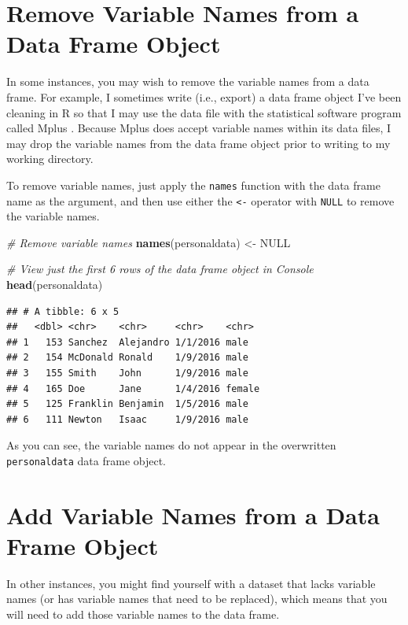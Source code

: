 \documentclass[]{book}
\newenvironment{Shaded}{\begin{snugshade}}{\end{snugshade}}
\newcommand{\KeywordTok}[1]{\textcolor[rgb]{0.13,0.29,0.53}{\textbf{#1}}}
\newcommand{\StringTok}[1]{\textcolor[rgb]{0.31,0.60,0.02}{#1}}
\newcommand{\CommentTok}[1]{\textcolor[rgb]{0.56,0.35,0.01}{\textit{#1}}}
\newcommand{\OtherTok}[1]{\textcolor[rgb]{0.56,0.35,0.01}{#1}}
\newcommand{\NormalTok}[1]{#1}
\begin{document}
\section{Remove Variable Names from a Data Frame
Object}\label{remove-variable-names-from-a-data-frame-object}

In some instances, you may wish to remove the variable names from a data
frame. For example, I sometimes write (i.e., export) a data frame object
I've been cleaning in R so that I may use the data file with the
statistical software program called Mplus \citep{mplus}. Because Mplus
does accept variable names within its data files, I may drop the
variable names from the data frame object prior to writing to my working
directory.

To remove variable names, just apply the \texttt{names} function with
the data frame name as the argument, and then use either the
\texttt{\textless{}-} operator with \texttt{NULL} to remove the variable
names.

\begin{Shaded}
\begin{Highlighting}[]
\CommentTok{# Remove variable names}
\KeywordTok{names}\NormalTok{(personaldata) <-}\StringTok{ }\OtherTok{NULL}

\CommentTok{# View just the first 6 rows of the data frame object in Console}
\KeywordTok{head}\NormalTok{(personaldata)}
\end{Highlighting}
\end{Shaded}

\begin{verbatim}
## # A tibble: 6 x 5
##   <dbl> <chr>    <chr>     <chr>    <chr> 
## 1   153 Sanchez  Alejandro 1/1/2016 male  
## 2   154 McDonald Ronald    1/9/2016 male  
## 3   155 Smith    John      1/9/2016 male  
## 4   165 Doe      Jane      1/4/2016 female
## 5   125 Franklin Benjamin  1/5/2016 male  
## 6   111 Newton   Isaac     1/9/2016 male
\end{verbatim}

As you can see, the variable names do not appear in the overwritten
\texttt{personaldata} data frame object.

\section{Add Variable Names from a Data Frame
Object}\label{add-variable-names-from-a-data-frame-object}

In other instances, you might find yourself with a dataset that lacks
variable names (or has variable names that need to be replaced), which
means that you will need to add those variable names to the data frame.
\end{document}
